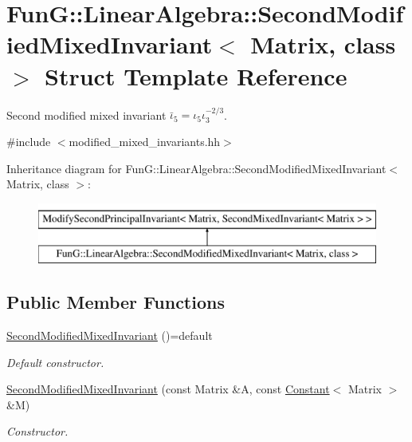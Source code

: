 \hypertarget{structFunG_1_1LinearAlgebra_1_1SecondModifiedMixedInvariant}{\section{Fun\-G\-:\-:Linear\-Algebra\-:\-:Second\-Modified\-Mixed\-Invariant$<$ Matrix, class $>$ Struct Template Reference}
\label{structFunG_1_1LinearAlgebra_1_1SecondModifiedMixedInvariant}
}


Second modified mixed invariant $\bar\iota_5=\iota_5\iota_3^{-2/3}$.  




{\ttfamily \#include $<$modified\-\_\-mixed\-\_\-invariants.\-hh$>$}

Inheritance diagram for Fun\-G\-:\-:Linear\-Algebra\-:\-:Second\-Modified\-Mixed\-Invariant$<$ Matrix, class $>$\-:\begin{figure}[H]
\begin{center}
\leavevmode
\includegraphics[height=2.000000cm]{structFunG_1_1LinearAlgebra_1_1SecondModifiedMixedInvariant}
\end{center}
\end{figure}
\subsection*{Public Member Functions}
\begin{DoxyCompactItemize}
\item 
\hypertarget{structFunG_1_1LinearAlgebra_1_1SecondModifiedMixedInvariant_a7ab36c0b69e16205a6aadcd61d8bed61}{\hyperlink{structFunG_1_1LinearAlgebra_1_1SecondModifiedMixedInvariant_a7ab36c0b69e16205a6aadcd61d8bed61}{Second\-Modified\-Mixed\-Invariant} ()=default}\label{structFunG_1_1LinearAlgebra_1_1SecondModifiedMixedInvariant_a7ab36c0b69e16205a6aadcd61d8bed61}

\begin{DoxyCompactList}\small\item\em Default constructor. \end{DoxyCompactList}\item 
\hyperlink{structFunG_1_1LinearAlgebra_1_1SecondModifiedMixedInvariant_a14b48ec7960d8c42d2bf8c1258e20fce}{Second\-Modified\-Mixed\-Invariant} (const Matrix \&A, const \hyperlink{structFunG_1_1Constant}{Constant}$<$ Matrix $>$ \&M)
\begin{DoxyCompactList}\small\item\em Constructor. \end{DoxyCompactList}\end{DoxyCompactItemize}


